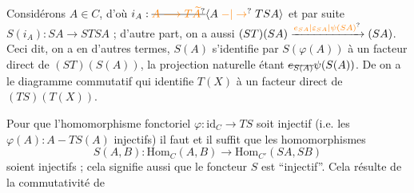 
Considérons  $A\in C$, d'où  $i_A:\deleted{\unsure{A\longrightarrow T\widetilde A}}\inserted{A\mathrel{\unsure{-|\to}}TSA}$  et par suite $S(i_A):SA\longrightarrow STSA$ ; d'autre part, on a aussi $(ST)(SA)\xrightarrow{\unsure{e_{SA}|\varepsilon_{SA}|\psi(SA)}}(SA)$. Ceci dit, on a
en d'autres termes, $S(A)$ s'identifie par $S(\varphi(A))$ à un facteur direct de $(ST)(S(A))$, la projection naturelle étant $\deleted{e_{S(A)}}\psi(S(A))$. De \textquotedbl on a le diagramme commutatif
qui identifie $T(X)$ à un facteur direct de $(TS)(T(X))$.

Pour que l'homomorphisme fonctoriel $\varphi:\mathrm{id}_C\longrightarrow TS$ soit injectif (i.e. les $\varphi(A):A\mathrel{-}TS(A)$ injectifs) il faut et il suffit que les homomorphismes
\[
 S(A,B):\mathrm{Hom}_C(A,B)\longrightarrow\mathrm{Hom}_{C'}(SA,SB)
\]
soient injectifs ; cela signifie aussi que le foncteur $S$ est  ``injectif''. Cela résulte de la commutativité de
